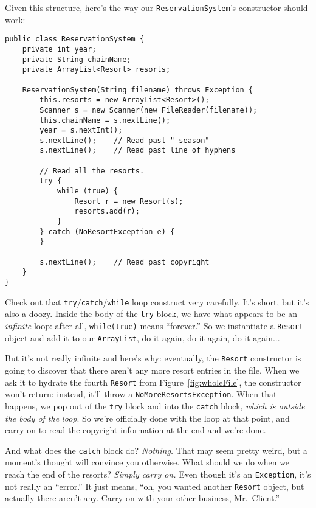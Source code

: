 Given this structure, here's the way our \texttt{ReservationSystem}'s
constructor should work:

\begin{Verbatim}[fontsize=\footnotesize,samepage=true,frame=single]
public class ReservationSystem {
    private int year;
    private String chainName;
    private ArrayList<Resort> resorts;

    ReservationSystem(String filename) throws Exception {
        this.resorts = new ArrayList<Resort>();
        Scanner s = new Scanner(new FileReader(filename));
        this.chainName = s.nextLine();
        year = s.nextInt();
        s.nextLine();    // Read past " season"
        s.nextLine();    // Read past line of hyphens

        // Read all the resorts.
        try {
            while (true) {
                Resort r = new Resort(s);
                resorts.add(r);
            }
        } catch (NoResortException e) {
        }

        s.nextLine();    // Read past copyright
    }
}
\end{Verbatim}

Check out that \texttt{try}/\texttt{catch}/\texttt{while} loop construct
very carefully. It's short, but it's also a doozy. Inside the body of the
\texttt{try} block, we have what appears to be an \textit{infinite} loop:
after all, \texttt{while(true)} means ``forever.'' So we instantiate a
\texttt{Resort} object and add it to our \texttt{ArrayList}, do it again, do
it again, do it again...

But it's not really infinite and here's why: eventually, the \texttt{Resort}
constructor is going to discover that there aren't any more resort entries in
the file. When we ask it to hydrate the fourth \texttt{Resort} from
Figure~\ref{fig:wholeFile}, the constructor won't return: instead, it'll throw
a \texttt{NoMoreResortsException}. When that happens, we pop out of the
\texttt{try} block and into the \texttt{catch} block, \textit{which is outside
the body of the loop}. So we're officially done with the loop at that point,
and carry on to read the copyright information at the end and we're done.

And what does the \texttt{catch} block do? \textit{Nothing.} That may seem
pretty weird, but a moment's thought will convince you otherwise. What should
we do when we reach the end of the resorts? \textit{Simply carry on.} Even
though it's an \texttt{Exception}, it's not really an ``error.'' It just
means, ``oh, you wanted another \texttt{Resort} object, but actually there
aren't any. Carry on with your other business, Mr.~Client.''

